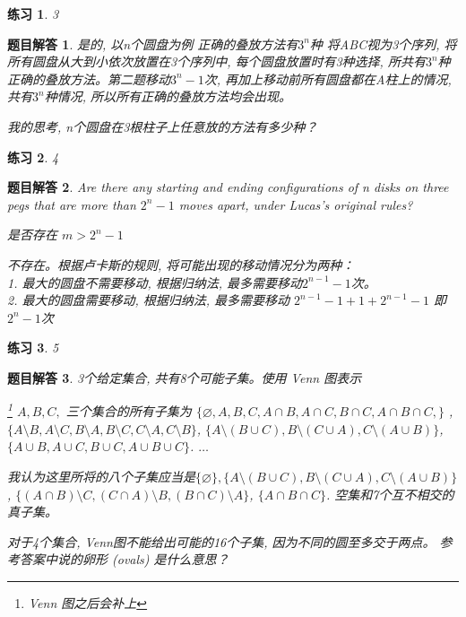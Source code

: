 \documentclass[mode=geye]{elegantnote}
\newtheorem{exercise}{练习}
\newtheorem{answer}{题目解答}
\begin{document}
\begin{exercise}3
\end{exercise}

\begin{answer}
	是的, 以n个圆盘为例
	正确的叠放方法有$ 3^n $种 将ABC视为3个序列, 将所有圆盘从大到小依次放置在3个序列中, 每个圆盘放置时有3种选择, 所共有$ 3^n $种正确的叠放方法。第二题移动$ 3^n-1 $次, 再加上移动前所有圆盘都在A柱上的情况, 共有$ 3^n $种情况, 所以所有正确的叠放方法均会出现。
	
	我的思考, n个圆盘在3根柱子上任意放的方法有多少种？
\end{answer}

\begin{exercise}4
\end{exercise}

\begin{answer}
	Are there any starting and ending configurations of n disks on three pegs
	that are more than $ 2^n - 1 $ moves apart, under Lucas's original rules?
	
	是否存在 $ m > 2^n-1 $
	
	不存在。根据卢卡斯的规则, 将可能出现的移动情况分为两种：\\		
	1. 最大的圆盘不需要移动, 根据归纳法, 最多需要移动$ 2^{n-1}-1 $次。\\	
	2. 最大的圆盘需要移动, 根据归纳法, 最多需要移动 $ 2^{n-1}-1 + 1 + 2^{n-1}-1 $ 即 $  2^{n}-1  $次
\end{answer}

\begin{exercise}5
\end{exercise}

\begin{answer}
	3个给定集合, 共有8个可能子集。使用 Venn 图表示
	
	\footnote{Venn 图之后会补上}
	$ A, B, C, $ 三个集合的所有子集为 $ \{\varnothing, A, B, C, A\cap B, A\cap C, B\cap C, A \cap B \cap C, \} $ , $\{A\setminus B, A\setminus C, B\setminus A, B\setminus C, C\setminus A, C\setminus B \}$, $ \{A\setminus (B\cup C), B\setminus (C\cup A), C\setminus (A\cup B)\} $, $ \{A\cup B, A\cup C, B\cup C, A\cup B\cup C\} $. $ \dots $
	
	我认为这里所将的八个子集应当是$ \{\varnothing\}, \{A\setminus (B\cup C), B\setminus (C\cup A), C\setminus (A\cup B)\} $, $ \{(A\cap B)\setminus C, (C\cap A)\setminus B, (B\cap C)\setminus A \} $, $ \{A\cap B\cap C\} $. 空集和7个互不相交的真子集。
	
	对于4个集合, Venn图不能给出可能的16个子集, 因为不同的圆至多交于两点。 参考答案中说的卵形 (ovals) 是什么意思？
\end{answer}
\end{document}
